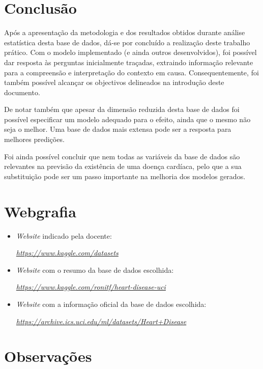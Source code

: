 \documentclass[a4paper]{report}
\begin{document}
\chapter{Conclusão}
\large{
	Após a apresentação da metodologia e dos resultados obtidos durante análise estatística desta base de dados, dá-se por concluído a realização deste trabalho prático. 
	Com o modelo implementado (e ainda outros desenvolvidos), foi possível dar resposta às perguntas inicialmente traçadas, extraindo informação relevante para a compreensão e interpretação do contexto em causa. 
	Consequentemente, foi também possível alcançar os objectivos delineados na introdução deste documento. 
	
	De notar também que apesar da dimensão reduzida desta base de dados foi possível especificar um modelo adequado para o efeito, ainda que o mesmo não seja o melhor. 
	Uma base de dados mais extensa pode ser a resposta para melhores predições.

	Foi ainda possível concluir que nem todas as variáveis da base de dados são relevantes na previsão da existência de uma doença cardíaca, pelo que a sua substituição pode ser um passo importante na melhoria dos modelos gerados.
}

\chapter{Webgrafia}
	\begin{itemize}
		\item \textit{Website} indicado pela docente:
		\par \textit{\url{https://www.kaggle.com/datasets}}
        \item \textit{Website} com o resumo da base de dados escolhida:
		\par \textit{\url{https://www.kaggle.com/ronitf/heart-disease-uci}}
		\item \textit{Website} com a informação oficial da base de dados escolhida:
		\par \textit{\url{https://archive.ics.uci.edu/ml/datasets/Heart+Disease}}
	\end{itemize}
	
\appendix
\chapter{Observações}
\end{document}

